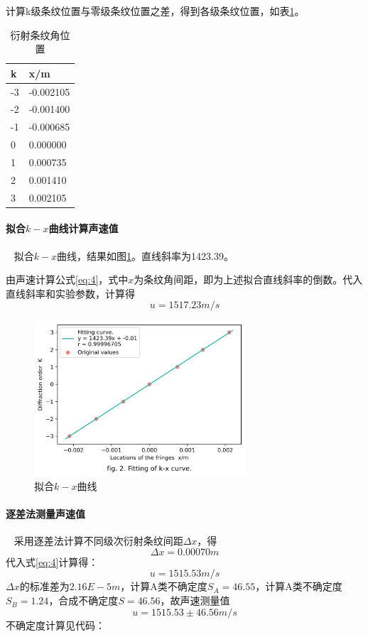 \documentclass[12pt,a4paper,UTF8]{ctexart}
\begin{document}
		计算k级条纹位置与零级条纹位置之差，得到各级条纹位置，如表\ref{tab:4}。
		\begin{table}[htbp]
			\centering
			\begin{tabular}{|l|l|}
			\hline
				k & x/m \\ \hline
				-3 & -0.002105 \\ \hline
				-2 & -0.001400 \\ \hline
				-1 & -0.000685 \\ \hline
				0 & 0.000000 \\ \hline
				1 & 0.000735 \\ \hline
				2 & 0.001410 \\ \hline
				3 & 0.002105 \\ \hline
			\end{tabular}
			\caption{衍射条纹角位置}
			\label{tab:4}
		\end{table}
		
		\paragraph{拟合$k-x$曲线计算声速值}~
		\newline
		\indent
		拟合$k-x$曲线，结果如图\ref{fig:2}。直线斜率为1423.39。

		由声速计算公式\ref{eq:4}，式中$x$为条纹角间距，即为上述拟合直线斜率的倒数。代入直线斜率和实验参数，计算得
		$$
		u = 1517.23 m/s
		$$
		
		\begin{figure}[htbp]
			\centering
			\includegraphics[width=0.7\textwidth]{attachments/fig.2.png}
			\caption{拟合$k-x$曲线}
			\label{fig:2}
		\end{figure}

		\paragraph{逐差法测量声速值}~
		\newline
		\indent
		采用逐差法计算不同级次衍射条纹间距$\Delta x$，得
		$$
		\Delta x = 0.00070 m
		$$
		代入式\ref{eq:4}计算得：
		$$
		u = 1515.53 m/s
		$$
		$\Delta x$的标准差为$2.16E-5 m$，计算A类不确定度$S_A = 46.55$，计算A类不确定度$S_B = 1.24$，合成不确定度$S = 46.56$，故声速测量值
		$$
		u = 1515.53 \pm 46.56 m/s
		$$
		不确定度计算见代码：
\end{document}
